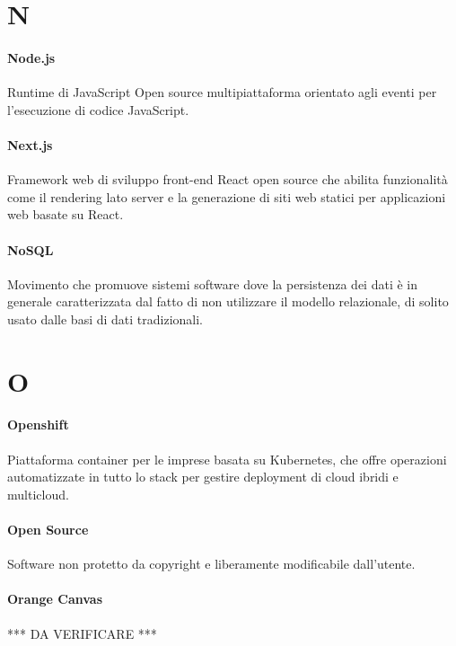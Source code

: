 \documentclass[]{article}
\begin{document}
	\newpage
	
	\section*{N}
	
	\paragraph*{Node.js}
	Runtime di JavaScript Open source multipiattaforma orientato agli eventi per l'esecuzione di codice JavaScript.
	
	\paragraph*{Next.js}
	Framework web di sviluppo front-end React open source che abilita funzionalità come il rendering lato server e la generazione di siti web statici per applicazioni web basate su React.
	
	\paragraph*{NoSQL} 
	Movimento che promuove sistemi software dove la persistenza dei dati è in generale caratterizzata dal fatto di non utilizzare il modello relazionale, di solito usato dalle basi di dati tradizionali.
	
	\newpage
	
	\section*{O}
	
	\paragraph*{Openshift}
	Piattaforma container per le imprese basata su Kubernetes, che offre operazioni automatizzate in tutto lo stack per gestire deployment di cloud ibridi e multicloud.
	
	\paragraph*{Open Source}
	Software non protetto da copyright e liberamente modificabile dall'utente.
	
	\paragraph*{Orange Canvas}
	*** DA VERIFICARE ***
	
\end{document}
